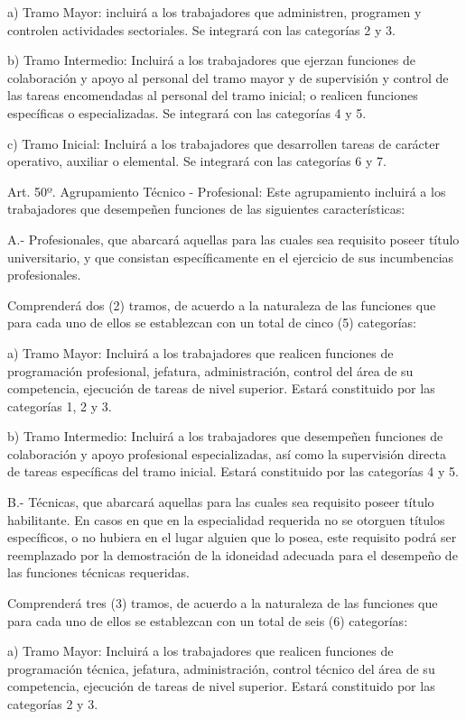 \documentclass[]{article}
\begin{document}
a) Tramo Mayor: incluirá a los trabajadores que administren, programen y
controlen actividades sectoriales. Se integrará con las categorías 2 y
3.

b) Tramo Intermedio: Incluirá a los trabajadores que ejerzan funciones
de colaboración y apoyo al personal del tramo mayor y de supervisión y
control de las tareas encomendadas al personal del tramo inicial; o
realicen funciones específicas o especializadas. Se integrará con las
categorías 4 y 5.

c) Tramo Inicial: Incluirá a los trabajadores que desarrollen tareas de
carácter operativo, auxiliar o elemental. Se integrará con las
categorías 6 y 7.

Art. 50º. Agrupamiento Técnico - Profesional: Este agrupamiento incluirá
a los trabajadores que desempeñen funciones de las siguientes
características:

A.- Profesionales, que abarcará aquellas para las cuales sea requisito
poseer título universitario, y que consistan específicamente en el
ejercicio de sus incumbencias profesionales.

Comprenderá dos (2) tramos, de acuerdo a la naturaleza de las funciones
que para cada uno de ellos se establezcan con un total de cinco (5)
categorías:

a) Tramo Mayor: Incluirá a los trabajadores que realicen funciones de
programación profesional, jefatura, administración, control del área de
su competencia, ejecución de tareas de nivel superior. Estará
constituido por las categorías 1, 2 y 3.

b) Tramo Intermedio: Incluirá a los trabajadores que desempeñen
funciones de colaboración y apoyo profesional especializadas, así como
la supervisión directa de tareas específicas del tramo inicial. Estará
constituido por las categorías 4 y 5.

B.- Técnicas, que abarcará aquellas para las cuales sea requisito poseer
título habilitante. En casos en que en la especialidad requerida no se
otorguen títulos específicos, o no hubiera en el lugar alguien que lo
posea, este requisito podrá ser reemplazado por la demostración de la
idoneidad adecuada para el desempeño de las funciones técnicas
requeridas.

Comprenderá tres (3) tramos, de acuerdo a la naturaleza de las funciones
que para cada uno de ellos se establezcan con un total de seis (6)
categorías:

a) Tramo Mayor: Incluirá a los trabajadores que realicen funciones de
programación técnica, jefatura, administración, control técnico del área
de su competencia, ejecución de tareas de nivel superior. Estará
constituido por las categorías 2 y 3.
\end{document}
